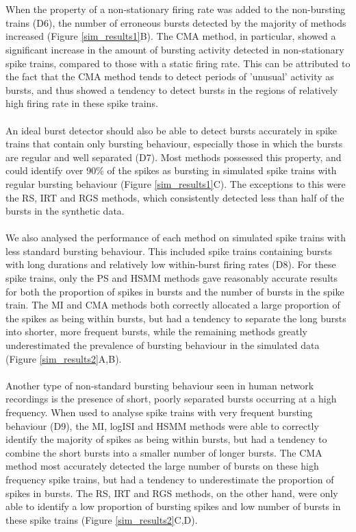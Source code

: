 \documentclass[12pt, titlepage]{article}
\begin{document}
\\ \\ When the property of a non-stationary firing rate was added to the non-bursting trains (D6), the number of erroneous bursts detected by the majority of methods increased (Figure \ref{sim_results1}B). The CMA method, in particular, showed a significant increase in the amount of bursting activity detected in non-stationary spike trains, compared to those with a static firing rate. This can be attributed to the fact that the CMA method tends to detect periods of 'unusual' activity as bursts, and thus showed a tendency to detect bursts in the regions of relatively high firing rate in these spike trains.
\\ \\ An ideal burst detector should also be able to detect bursts accurately in spike trains that contain only bursting behaviour, especially those in which the bursts are regular and well separated (D7). Most methods possessed this property, and could identify over 90\% of the spikes as bursting in simulated spike trains with regular bursting behaviour (Figure \ref{sim_results1}C). The exceptions to this were the RS, IRT and RGS methods, which consistently detected less than half of the bursts in the synthetic data.
\\ \\ We also analysed the performance of each method on simulated spike trains with less standard bursting behaviour. This included  spike trains containing bursts with long durations and relatively low within-burst firing rates (D8). For these spike trains, only the PS and HSMM methods gave reasonably accurate results for both the proportion of spikes in bursts and the number of bursts in the spike train. The MI and CMA methods both correctly allocated a large proportion of the spikes as being within bursts, but had a tendency to separate the long bursts into shorter, more frequent bursts, while the remaining methods greatly underestimated the prevalence of bursting behaviour in the simulated data (Figure \ref{sim_results2}A,B).
\\ \\ Another type of non-standard bursting behaviour seen in human network recordings is the presence of short, poorly separated bursts occurring at a high frequency. When used to analyse spike trains with very frequent bursting behaviour (D9), the MI, logISI and HSMM methods were able to correctly identify the majority of spikes as being within bursts, but had a tendency to combine the short bursts into a smaller number of longer bursts. The CMA method most accurately detected the large number of bursts on these high frequency spike trains, but had a tendency to underestimate the proportion of spikes in bursts. The RS, IRT and RGS methods, on the other hand, were only able to identify a low proportion of bursting spikes and low number of bursts in these spike trains (Figure \ref{sim_results2}C,D).
\end{document}
